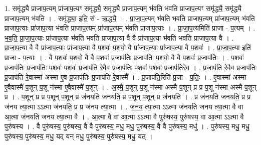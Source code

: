 \documentclass[17pt]{extarticle}
\begin{document}
1. समृ॑द्ध्यै प्राजाप॒त्यम् प्रा॑जाप॒त्यꣳ समृ॑द्ध्यै॒ समृ॑द्ध्यै प्राजाप॒त्यम् भ॑वति भवति प्राजाप॒त्यꣳ समृ॑द्ध्यै॒ समृ॑द्ध्यै प्राजाप॒त्यम् भ॑वति । . समृ॑द्ध्या॒ इति॒ सं - ऋ॒द्ध्यै॒ । . प्रा॒जा॒प॒त्यम् भ॑वति भवति प्राजाप॒त्यम् प्रा॑जाप॒त्यम् भ॑वति प्राजाप॒त्याः प्रा॑जाप॒त्या भ॑वति प्राजाप॒त्यम् प्रा॑जाप॒त्यम् भ॑वति प्राजाप॒त्याः । . प्रा॒जा॒प॒त्यमिति॑ प्राजा - प॒त्यम् । . भ॒व॒ति॒ प्रा॒जा॒प॒त्याः प्रा॑जाप॒त्या भ॑वति भवति प्राजाप॒त्या वै वै प्रा॑जाप॒त्या भ॑वति भवति प्राजाप॒त्या वै । . प्रा॒जा॒प॒त्या वै वै प्रा॑जाप॒त्याः प्रा॑जाप॒त्या वै प॒शवः॑ प॒शवो॒ वै प्रा॑जाप॒त्याः प्रा॑जाप॒त्या वै प॒शवः॑ । . प्रा॒जा॒प॒त्या इति॑ प्राजा - प॒त्याः । . वै प॒शवः॑ प॒शवो॒ वै वै प॒शवः॑ प्र॒जाप॑तिः प्र॒जाप॑तिः प॒शवो॒ वै वै प॒शवः॑ प्र॒जाप॑तिः । . प॒शवः॑ प्र॒जाप॑तिः प्र॒जाप॑तिः प॒शवः॑ प॒शवः॑ प्र॒जाप॑ति रे॒वैव प्र॒जाप॑तिः प॒शवः॑ प॒शवः॑ प्र॒जाप॑तिरे॒व । . प्र॒जाप॑ति रे॒वैव प्र॒जाप॑तिः प्र॒जाप॑ति रे॒वास्मा॑ अस्मा ए॒व प्र॒जाप॑तिः प्र॒जाप॑ति रे॒वास्मै᳚ । . प्र॒जाप॑ति॒रिति॑ प्र॒जा - प॒तिः॒ । . ए॒वास्मा॑ अस्मा ए॒वैवास्मै॑ प॒शून् प॒शू न॑स्मा ए॒वैवास्मै॑ प॒शून् । . अ॒स्मै॒ प॒शून् प॒शू न॑स्मा अस्मै प॒शून् प्र प्र प॒शू न॑स्मा अस्मै प॒शून् प्र । . प॒शून् प्र प्र प॒शून् प॒शून् प्र ज॑नयति जनयति॒ प्र प॒शून् प॒शून् प्र ज॑नयति । . प्र ज॑नयति जनयति॒ प्र प्र ज॑नय त्या॒त्मा ऽऽत्मा ज॑नयति॒ प्र प्र ज॑नय त्या॒त्मा । . ज॒न॒य॒ त्या॒त्मा ऽऽत्मा ज॑नयति जनय त्या॒त्मा वै वा आ॒त्मा ज॑नयति जनय त्या॒त्मा वै । . आ॒त्मा वै वा आ॒त्मा ऽऽत्मा वै पुरु॑षस्य॒ पुरु॑षस्य॒ वा आ॒त्मा ऽऽत्मा वै पुरु॑षस्य । . वै पुरु॑षस्य॒ पुरु॑षस्य॒ वै वै पुरु॑षस्य॒ मधु॒ मधु॒ पुरु॑षस्य॒ वै वै पुरु॑षस्य॒ मधु॑ । . पुरु॑षस्य॒ मधु॒ मधु॒ पुरु॑षस्य॒ पुरु॑षस्य॒ मधु॒ यद् यन् मधु॒ पुरु॑षस्य॒ पुरु॑षस्य॒ मधु॒ यत् । \newline
\end{document}
